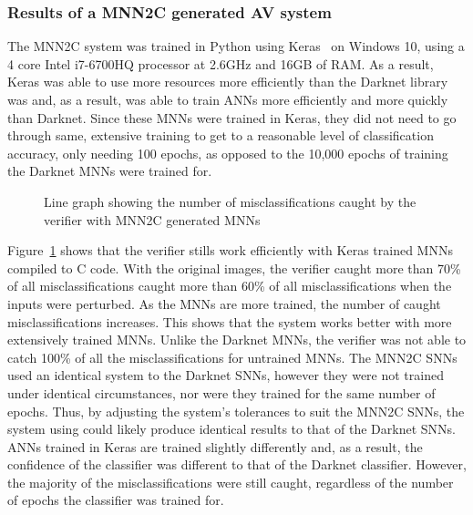\subsubsection{Results of a \ac{MNN2C} generated \ac{AV} system}
The \ac{MNN2C} system was trained in Python using Keras~\cite{chollet2015keras} on Windows 10, using a 4 core Intel i7-6700HQ processor at 2.6GHz and 16GB of RAM.
As a result, Keras was able to use more resources more efficiently than the Darknet library was and, as a result, was able to train \acp{ANN} more efficiently and more quickly than Darknet.
Since these \acp{MNN} were trained in Keras, they did not need to go through same, extensive training to get to a reasonable level of classification accuracy, only needing 100 epochs, as opposed to the 10,000 epochs of training the Darknet \acp{MNN} were trained for.

\begin{figure}[H]
	\centering
	\scalebox{0.9}{}
	\caption{Line graph showing the number of misclassifications caught by the verifier with \ac{MNN2C} generated \acp{MNN} \label{fig:sign-graphboth-mnn2c}}
\end{figure}

Figure~\ref{fig:sign-graphboth-mnn2c} shows that the verifier stills work efficiently with Keras trained \acp{MNN} compiled to C code.
With the original images, the verifier caught more than 70\% of all misclassifications caught more than 60\% of all misclassifications when the inputs were perturbed.
As the \acp{MNN} are more trained, the number of caught misclassifications increases.
This shows that the system works better with more extensively trained \acp{MNN}.
Unlike the Darknet \acp{MNN}, the verifier was not able to catch 100\% of all the misclassifications for untrained \acp{MNN}.
The \ac{MNN2C} \acp{SNN} used an identical system to the Darknet \acp{SNN}, however they were not trained under identical circumstances, nor were they trained for the same number of epochs.
Thus, by adjusting the system's tolerances to suit the \ac{MNN2C} \acp{SNN}, the system using could likely produce identical results to that of the Darknet \acp{SNN}.
\acp{ANN} trained in Keras are trained slightly differently and, as a result, the confidence of the classifier was different to that of the Darknet classifier.
However, the majority of the misclassifications were still caught, regardless of the number of epochs the classifier was trained for.





















